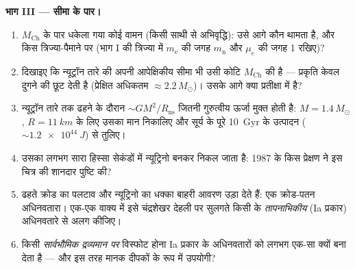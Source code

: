 \begin{problem}
\medskip\noindent\textbf{भाग III --- सीमा के पार।}
\begin{enumerate}[resume]
  \item $M_{\text{Ch}}$ के पार धकेला गया कोई वामन (किसी साथी से
        अभिवृद्धि): उसे आगे कौन थामता है, और किस त्रिज्या-पैमाने पर
        (भाग I की त्रिज्या में $m_{\text{e}}$ की जगह $m_{\text{n}}$
        और $\mu_e$ की जगह 1 रखिए)?
  \item दिखाइए कि न्यूट्रॉन तारे की अपनी आपेक्षिकीय सीमा भी उसी
        कोटि $M_{\text{Ch}}$ की है --- प्रकृति केवल दुगने की छूट
        देती है (प्रेक्षित अधिकतम $\approx
        2.2\,M_\odot$)। उसके आगे क्या प्रतीक्षा में है?
  \item न्यूट्रॉन तारे तक ढहने के दौरान $\sim GM^2/R_{
        \text{ns}}$ जितनी गुरुत्वीय ऊर्जा मुक्त होती है:
        $M = 1.4\,M_\odot$, $R = \qty{11}{km}$ के लिए उसका मान
        निकालिए और सूर्य के पूरे \qty{10}{Gyr} के उत्पादन
        ($\sim\qty{1.2e44}{J}$) से तुलिए।
  \item उसका लगभग सारा हिस्सा सेकंडों में न्यूट्रिनो बनकर निकल
        जाता है: 1987 के किस प्रेक्षण ने इस चित्र की शानदार पुष्टि की?
  \item ढहते क्रोड का पलटाव और न्यूट्रिनो का धक्का बाहरी आवरण उड़ा
        देते हैं: एक क्रोड-पतन अधिनवतारा। एक-एक वाक्य में इसे
        चंद्रशेखर देहली पर सुलगते किसी  के
        \emph{तापनाभिकीय} (Ia प्रकार) अधिनवतारे से अलग कीजिए।
  \item किसी \emph{सार्वभौमिक द्रव्यमान पर} विस्फोट होना Ia प्रकार
        के अधिनवतारों को लगभग एक-सा क्यों बना देता है --- और इस तरह
        मानक दीपकों के रूप में उपयोगी?
\end{enumerate}


\end{problem}
